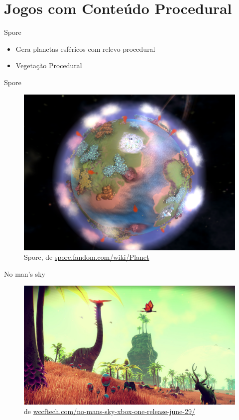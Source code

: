 \section{Jogos com Conteúdo Procedural}

\begin{frame}{Spore}
    \begin{itemize}
        \item Gera planetas esféricos com relevo procedural
        \item Vegetação Procedural
    \end{itemize}
\end{frame}

\begin{frame}{Spore}
    \begin{figure}
  		\centering
        \includegraphics[width=.8\textwidth]{img/gameseg/spore.png}
        \caption{Spore, de \url{spore.fandom.com/wiki/Planet}}
    \end{figure}
\end{frame}

\begin{frame}{No man's sky}
    \begin{figure}
  		\centering
        \includegraphics[width=.8\textwidth]{img/gameseg/No-Mans-Sky.jpg}
        \caption{de \url{wccftech.com/no-mans-sky-xbox-one-release-june-29/}}
    \end{figure}
\end{frame}


% 
% 
